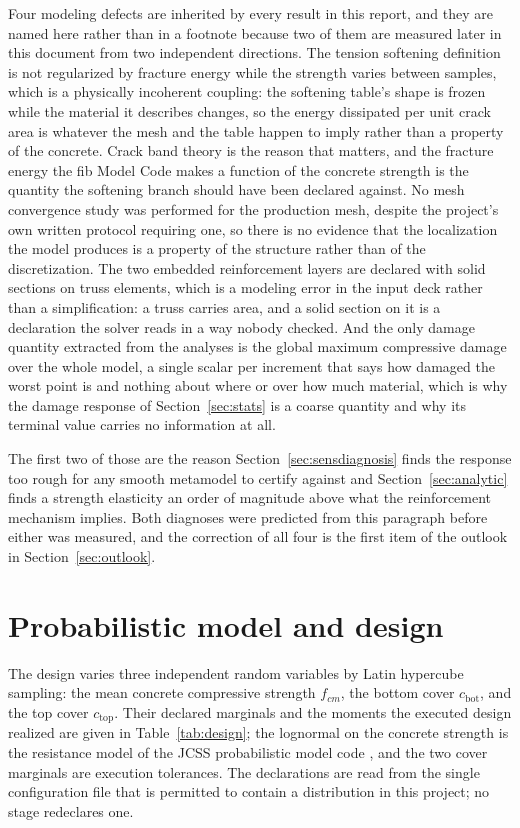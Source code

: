 \documentclass[11pt,a4paper]{article}
\begin{document}
Four modeling defects are inherited by every result in this report, and they are named here rather than in a footnote because two of them are measured later in this document from two independent directions. The tension softening definition is not regularized by fracture energy while the strength varies between samples, which is a physically incoherent coupling: the softening table's shape is frozen while the material it describes changes, so the energy dissipated per unit crack area is whatever the mesh and the table happen to imply rather than a property of the concrete. Crack band theory \cite{bazant1983} is the reason that matters, and the fracture energy the fib Model Code makes a function of the concrete strength \cite{fib2010} is the quantity the softening branch should have been declared against. No mesh convergence study was performed for the production mesh, despite the project's own written protocol requiring one, so there is no evidence that the localization the model produces is a property of the structure rather than of the discretization. The two embedded reinforcement layers are declared with solid sections on truss elements, which is a modeling error in the input deck rather than a simplification: a truss carries area, and a solid section on it is a declaration the solver reads in a way nobody checked. And the only damage quantity extracted from the analyses is the global maximum compressive damage over the whole model, a single scalar per increment that says how damaged the worst point is and nothing about where or over how much material, which is why the damage response of Section~\ref{sec:stats} is a coarse quantity and why its terminal value carries no information at all.

The first two of those are the reason Section~\ref{sec:sensdiagnosis} finds the response too rough for any smooth metamodel to certify against and Section~\ref{sec:analytic} finds a strength elasticity an order of magnitude above what the reinforcement mechanism implies. Both diagnoses were predicted from this paragraph before either was measured, and the correction of all four is the first item of the outlook in Section~\ref{sec:outlook}.

\section{Probabilistic model and design}
\label{sec:design}
The design varies three independent random variables by Latin hypercube sampling: the mean concrete compressive strength $f_{cm}$, the bottom cover $c_{\mathrm{bot}}$, and the top cover $c_{\mathrm{top}}$. Their declared marginals and the moments the executed design realized are given in Table~\ref{tab:design}; the lognormal on the concrete strength is the resistance model of the JCSS probabilistic model code \cite{jcss}, and the two cover marginals are execution tolerances. The declarations are read from the single configuration file that is permitted to contain a distribution in this project; no stage redeclares one.
\end{document}

